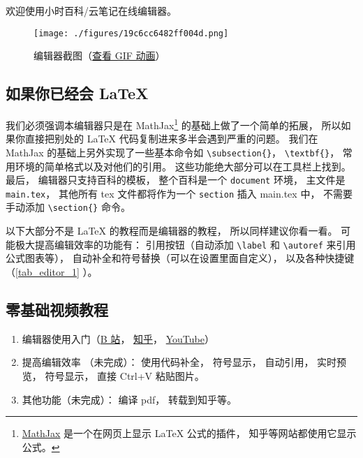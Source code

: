 
欢迎使用小时百科/云笔记在线编辑器。
\begin{figure}[ht]
\centering
\texttt{[image: ./figures/19c6cc6482ff004d.png]}
\caption{编辑器截图（\href{https://wuli.wiki/apps/editor.gif}{查看 GIF 动画}）} \label{fig_editor_3}
\end{figure}


\subsection{如果你已经会 LaTeX}
我们必须强调本编辑器只是在 MathJax\footnote{\href{https://www.mathjax.org/}{MathJax} 是一个在网页上显示 LaTeX 公式的插件， 知乎等网站都使用它显示公式。} 的基础上做了一个简单的拓展， 所以如果你直接把别处的 LaTeX 代码复制进来多半会遇到严重的问题。 我们在 MathJax 的基础上另外实现了一些基本命令如 \verb|\subsection{}|， \verb|\textbf{}|， 常用环境的简单格式以及对他们的引用。 这些功能绝大部分可以在工具栏上找到。 最后， 编辑器只支持百科的模板， 整个百科是一个 \verb|document| 环境， 主文件是 \verb|main.tex|， 其他所有 tex 文件都将作为一个 \verb|section| 插入 main.tex 中， 不需要手动添加 \verb|\section{}| 命令。

以下大部分不是 LaTeX 的教程而是编辑器的教程， 所以同样建议你看一看。 可能极大提高编辑效率的功能有： 引用按钮（自动添加 \verb|\label| 和 \verb|\autoref| 来引用公式图表等）， 自动补全和符号替换（可以在设置里面自定义）， 以及各种快捷键（\autoref{tab_editor_1} ）。

\subsection{零基础视频教程}
\begin{enumerate}
\item 编辑器使用入门（\href{https://www.bilibili.com/video/av87698355/}{B 站}， \href{https://zhuanlan.zhihu.com/p/105869878}{知乎}， \href{https://www.youtube.com/watch?v=AN2tXNanD9U&t=1s}{YouTube}）
\item 提高编辑效率 （未完成）： 使用代码补全， 符号显示， 自动引用， 实时预览， 符号显示， 直接 Ctrl+V 粘贴图片。
\item 其他功能（未完成）： 编译 pdf， 转载到知乎等。
\end{enumerate}

